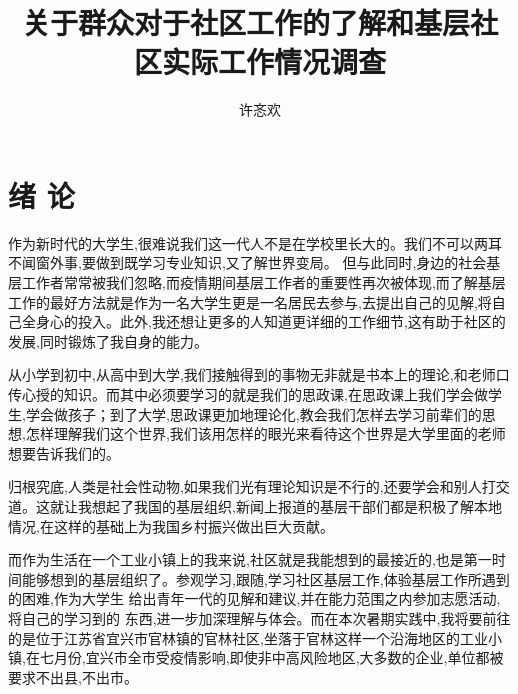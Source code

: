 \documentclass[AutoFakeBold]{LZUThesis}
\begin{document}
\title{{关于群众对于社区工作的了解}{和基层社区实际工作情况调查}}


\entitle{{}{}}

\author{许忞欢}



\maketitle
\frontmatter


\tableofcontents
\thispagestyle{empty}


\mainmatter
\chapter{绪 \qquad 论}
作为新时代的大学生,很难说我们这一代人不是在学校里长大的。我们不可以两耳不闻窗外事,要做到既学习专业知识,又了解世界变局。 但与此同时,身边的社会基层工作者常常被我们忽略,而疫情期间基层工作者的重要性再次被体现,而了解基层工作的最好方法就是作为一名大学生更是一名居民去参与,去提出自己的见解,将自己全身心的投入。此外,我还想让更多的人知道更详细的工作细节,这有助于社区的发展,同时锻炼了我自身的能力。

从小学到初中,从高中到大学,我们接触得到的事物无非就是书本上的理论,和老师口传心授的知识。而其中必须要学习的就是我们的思政课,在思政课上我们学会做学生,学会做孩子；到了大学,思政课更加地理论化,教会我们怎样去学习前辈们的思想,怎样理解我们这个世界,我们该用怎样的眼光来看待这个世界是大学里面的老师想要告诉我们的。

归根究底,人类是社会性动物,如果我们光有理论知识是不行的,还要学会和别人打交道。这就让我想起了我国的基层组织,新闻上报道的基层干部们都是积极了解本地情况,在这样的基础上为我国乡村振兴做出巨大贡献。

而作为生活在一个工业小镇上的我来说,社区就是我能想到的最接近的,也是第一时间能够想到的基层组织了。参观学习,跟随,学习社区基层工作,体验基层工作所遇到的困难,作为大学生 给出青年一代的见解和建议,并在能力范围之内参加志愿活动,将自己的学习到的 东西,进一步加深理解与体会。而在本次暑期实践中,我将要前往的是位于江苏省宜兴市官林镇的官林社区,坐落于官林这样一个沿海地区的工业小镇,在七月份,宜兴市全市受疫情影响,即使非中高风险地区,大多数的企业,单位都被要求不出县,不出市。
\end{document}
